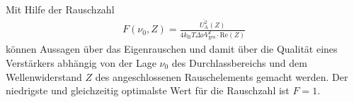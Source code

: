 Mit Hilfe der Rauschzahl
\begin{align}
  F(\nu_0,Z) = \frac{\overline{U_\text{A}^2}(Z)}{4 k_\text{B} T \Delta \nu V_\text{ges}^2 \cdot \text{Re}(Z)}\label{eqn:rauschzahl}
\end{align}
können Aussagen über das Eigenrauschen und damit über die Qualität eines Verstärkers abhängig von der
Lage $\nu_0$ des Durchlassbereichs und dem Wellenwiderstand $Z$ des angeschlossenen Rauschelements gemacht werden.
Der niedrigste und gleichzeitig optimalste Wert für die Rauschzahl ist $F = 1$.




\cite{anleitung}
